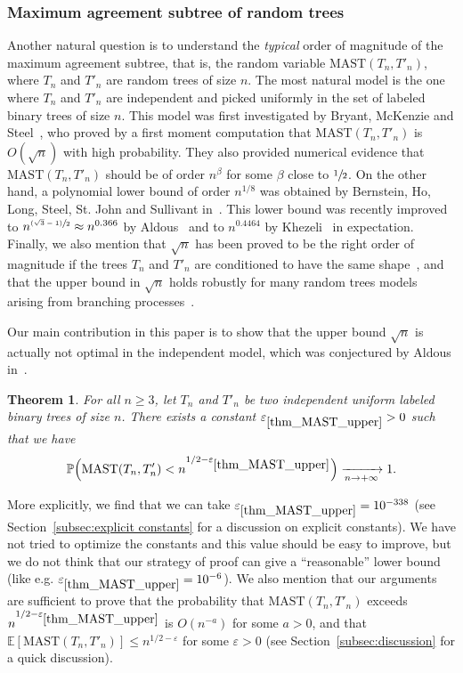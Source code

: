 \documentclass[11pt]{article}
\newcommand{\psfrac}[2]{\sfrac{(#1)}{#2}}
\newcommand{\Ec}[1]{\mathbb{E} \left[#1\right]}
\newcommand{\BPp}[1]{\mathbb{P} \Bigl(#1\Bigr)}
\newcommand{\MAST}{\mathrm{MAST}}
\let\eps\varepsilon
\theoremstyle{plain}
\newtheorem{theorem}{Theorem}
\theoremstyle{definition}
\numberwithin{equation}{section}
\begin{document}
\subsubsection*{Maximum agreement subtree of random trees}
Another natural question is to understand the \emph{typical} order of magnitude of the maximum agreement subtree, that is, the random variable $\MAST(T_n, T'_n)$, where $T_n$ and $T'_n$ are random trees of size $n$.
The most natural model is the one where $T_n$ and $T'_n$ are independent and picked uniformly in the set of labeled binary trees of size $n$.
This model was first investigated by Bryant, McKenzie and Steel~\cite{bryant_size_2003}, who proved by a first moment computation that $\MAST(T_n, T'_n)$ is $O(\sqrt{n})$ with high probability.
They also provided numerical evidence that $\MAST(T_n, T'_n)$ should be of order $n^{\beta}$ for some $\beta$ close to $\sfrac{1}{2}$.
On the other hand, a polynomial lower bound of order $n^{1/8}$ was obtained by Bernstein, Ho, Long, Steel, St. John and Sullivant in~\cite{bernstein_bounds_2015}. This lower bound was recently improved to $n^{\psfrac{\sqrt{3}-1}{2}}\approx n^{0.366}$ by Aldous~\cite{aldous_largest_2022} and to $n^{0.4464}$ by Khezeli~\cite{Khez22} in expectation. Finally, we also mention that $\sqrt{n}$ has been proved to be the right order of magnitude if the trees $T_n$ and $T'_n$ are conditioned to have the same shape~\cite{misra_bounds_2019}, and that the upper bound in $\sqrt{n}$ holds robustly for many random trees models arising from branching processes~\cite{Pit23}.

Our main contribution in this paper is to show that the upper bound $\sqrt{n}$ is actually not optimal in the independent model, which was conjectured by Aldous in~\cite{aldous_largest_2022}.


\begin{theorem}\label{thm_MAST_upper}
For all $n \geq 3$, let $T_n$ and $T'_n$ be two independent uniform labeled binary trees of size $n$. There exists a constant $\eps_{\ref{thm_MAST_upper}}>0$ such that we have
\[ \BPp{\MAST (T_n,T'_n) < n^{1/2-\eps_{\ref{thm_MAST_upper}}}} \xrightarrow[n \to +\infty]{} 1.\]
\end{theorem}


More explicitly, we find that we can take $\eps_{\ref{thm_MAST_upper}}=10^{-338}$ (see Section~\ref{subsec:explicit constants} for a discussion on explicit constants). We have not tried to optimize the constants and this value should be easy to improve, but we do not think that our strategy of proof can give a ``reasonable'' lower bound (like e.g. $\eps_{\ref{thm_MAST_upper}}=10^{-6}$). We also mention that our arguments are sufficient to prove that the probability that $\MAST(T_n,T'_n)$ exceeds $n^{1/2-\eps_{\ref{thm_MAST_upper}}}$ is $O(n^{-a})$ for some $a>0$, and that $\Ec{\MAST(T_n,T'_n)} \leq n^{1/2-\eps}$ for some $\eps>0$ (see Section~\ref{subsec:discussion} for a quick discussion).
\end{document}
